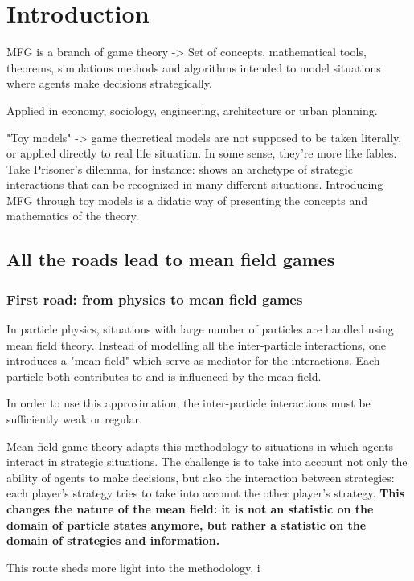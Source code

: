 \section{Introduction}
MFG is a branch of game theory -> Set of concepts, mathematical tools, theorems, simulations methods and algorithms intended to model situations where agents make decisions strategically.

Applied in economy, sociology, engineering, architecture or urban planning.

"Toy models" -> game theoretical models are not supposed to be taken literally, or applied directly to real life situation. In some sense, they're more like fables. Take Prisoner's dilemma, for instance: shows an archetype of strategic interactions that can be recognized in many different situations.
Introducing MFG through toy models is a didatic way of presenting the concepts and mathematics of the theory.
\subsection{All the roads lead to mean field games}

\subsubsection{First road: from physics to mean field games}
In particle physics, situations with large number of particles are handled using mean field theory. Instead of modelling all the inter-particle interactions, one introduces a "mean field" which serve as mediator for the interactions. Each particle both contributes to and is influenced by the mean field.

In order to use this approximation, the inter-particle interactions must be sufficiently weak or regular.

Mean field game theory adapts this methodology to situations in which agents interact in strategic situations. The challenge is to take into account not only the ability of agents to make decisions, but also the interaction between strategies: each player's strategy tries to take into account the other player's strategy.
\textbf{This changes the nature of the mean field: it is not an statistic on the domain of particle states anymore, but rather a statistic on the domain of strategies and information.}

This route sheds more light into the methodology, i